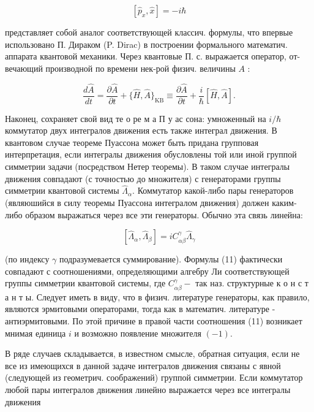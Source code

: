 \documentclass[10pt]{article}
\begin{document}
\[

\left[\hat{p}_{x}, \hat{x}\right]=-i \hbar

\]



представляет собой аналог соответствующей классич. формулы, что впервые использовано П. Дираком (P. Dirac) в построении формального математич. аппарата квантовой механики. Через квантовые П. с. выражается оператор, от- вечающий производной по времени нек-рой физич. величины $A$ :



\[

\frac{d \hat{A}}{d t}=\frac{\partial \hat{A}}{\partial t}+\{\hat{H}, \hat{A}\}_{\mathrm{KB}} \equiv \frac{\partial \hat{A}}{\partial t}+\frac{i}{\hbar}[\hat{H}, \hat{A}] .

\]



Наконец, сохраняет свой вид те о ре м а П у ас сона: умноженный на $i / \hbar$ коммутатор двух интегралов движения есть также интеграл движения. В квантовом случае теореме Пуассона может быть придана групповая интерпретация, если интегралы движения обусловлены той или иной группой симметрии задачи (посредством Нетер теоремы). В таком случае интегралы движения совпадают (с точностью до множителя) с генераторами группы симметрии квантовой системы $\hat{\Lambda}_{\alpha}$. Коммутатор какой-либо пары генераторов (являюшийся в силу теоремы Пуассона интегралом движения) должен каким-либо образом выражаться через все эти генераторы. Обычно эта связь линейна:



\[

\left[\hat{\Lambda}_{\alpha}, \hat{\Lambda}_{\beta}\right]=i C_{\alpha \beta}^{\gamma} \hat{\Lambda}_{\gamma}

\]



(по индексу $\gamma$ подразумевается суммирование). Формулы (11) фактически совпадают с соотношениями, определяющими алгебру Ли соответствующей группы симметрии квантовой системы, где $C_{\alpha \beta}^{\gamma}-$ так наз. структурные к о н с т а н т ы. Следует иметь в виду, что в физич. литературе генераторы, как правило, являются эрмитовыми операторами, тогда как в математич. литературе - антиэрмитовыми. По этой причине в правой части соотношения (11) возникает мнимая единица $i$ и возможно появление множителя $(-1)$.



В ряде случаев складывается, в известном смысле, обратная ситуация, если не все из имеющихся в данной задаче интегралов движения связаны с явной (следующей из геометрич. соображений) группой симметрии. Если коммутатор любой пары интегралов движения линейно выражается через все интегралы движения
\end{document}

